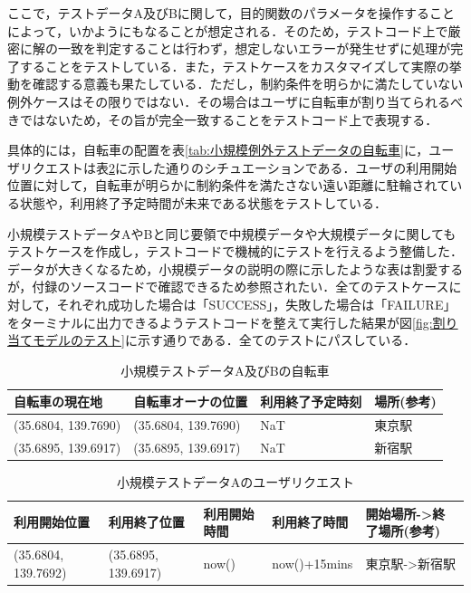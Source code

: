           \par ここで，テストデータA及びBに関して，目的関数のパラメータを操作することによって，いかようにもなることが想定される．そのため，テストコード上で厳密に解の一致を判定することは行わず，想定しないエラーが発生せずに処理が完了することをテストしている．また，テストケースをカスタマイズして実際の挙動を確認する意義も果たしている．ただし，制約条件を明らかに満たしていない例外ケースはその限りではない．その場合はユーザに自転車が割り当てられるべきではないため，その旨が完全一致することをテストコード上で表現する．
          \par 具体的には，自転車の配置を表\ref{tab:小規模例外テストデータの自転車}に，ユーザリクエストは表\ref{tab:小規模テストデータAのユーザリクエスト}に示した通りのシチュエーションである．ユーザの利用開始位置に対して，自転車が明らかに制約条件を満たさない遠い距離に駐輪されている状態や，利用終了予定時間が未来である状態をテストしている．
          \par 小規模テストデータAやBと同じ要領で中規模データや大規模データに関してもテストケースを作成し，テストコードで機械的にテストを行えるよう整備した．データが大きくなるため，小規模データの説明の際に示したような表は割愛するが，付録のソースコードで確認できるため参照されたい．全てのテストケースに対して，それぞれ成功した場合は「SUCCESS」，失敗した場合は「FAILURE」をターミナルに出力できるようテストコードを整えて実行した結果が図\ref{fig:割り当てモデルのテスト}に示す通りである．全てのテストにパスしている．

          \begin{table}[t]
            \caption{小規模テストデータA及びBの自転車}
            \label{tab:小規模テストデータA及びBの自転車}
            \centering
            \begin{tabular}{|l|l|l|l|} \hline
              自転車の現在地 & 自転車オーナの位置 & 利用終了予定時刻 & 場所(参考) \\ \hline
              (35.6804, 139.7690) & (35.6804, 139.7690) & NaT & 東京駅 \\
              (35.6895, 139.6917) & (35.6895, 139.6917) & NaT & 新宿駅 \\ \hline
            \end{tabular}
          \end{table}
          
          \begin{table}[t]
            \caption{小規模テストデータAのユーザリクエスト}
            \label{tab:小規模テストデータAのユーザリクエスト}
            \centering
            \begin{tabular}{|l|l|l|l|l|} \hline
              利用開始位置 & 利用終了位置 & 利用開始時間 & 利用終了時間 & 開始場所->終了場所(参考) \\ \hline
              (35.6804, 139.7692) & (35.6895, 139.6917) & now() & now()+15mins & 東京駅->新宿駅 \\ \hline
            \end{tabular}
          \end{table}

